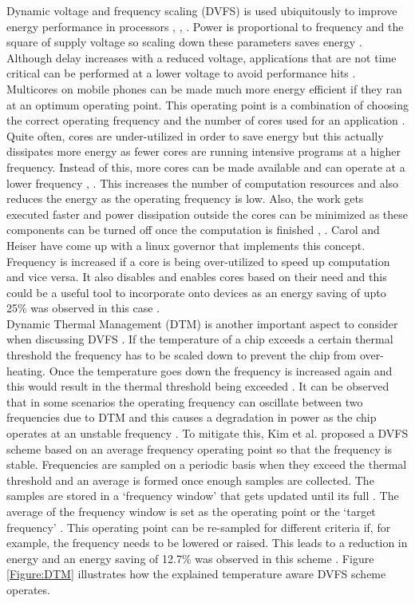 \documentclass[journal]{IEEEtran}
\begin{document}
Dynamic voltage and frequency scaling (DVFS) is used ubiquitously to improve energy performance in processors \cite{LinuxGov}, \cite{TempDVFS}, \cite{48Core}. Power is proportional to frequency and the square of supply voltage so scaling down these parameters saves energy \cite{TempDVFS}. Although delay increases with a reduced voltage, applications that are not time critical can be performed at a lower voltage to avoid performance hits \cite{LinuxGov}. Multicores on mobile phones can be made much more energy efficient if they ran at an optimum operating point. This operating point is a combination of choosing the correct operating frequency and the number of cores used for an application \cite{LinuxGov}. Quite often, cores are under-utilized in order to save energy but this actually dissipates more energy as fewer cores are running intensive programs at a higher frequency. Instead of this, more cores can be made available and can operate at a lower frequency \cite{LinuxGov}, \cite{MultiCores}. This increases the number of computation resources and also reduces the energy as the operating frequency is low. Also, the work gets executed faster and power dissipation outside the cores can be minimized as these components can be turned off once the computation is finished \cite{LinuxGov}, \cite{MultiCores}. Carol and Heiser \cite{LinuxGov} have come up with a linux governor that implements this concept. Frequency is increased if a core is being over-utilized to speed up computation and vice versa. It also disables and enables cores based on their need and this could be a useful tool to incorporate onto devices as an energy saving of upto 25\% was observed in this case \cite{LinuxGov}.\\

Dynamic Thermal Management (DTM) is another important aspect to consider when discussing DVFS \cite{TempDVFS}. If the temperature of a chip exceeds a certain thermal threshold the frequency has to be scaled down to prevent the chip from over-heating. Once the temperature goes down the frequency is increased again and this would result in the thermal threshold being exceeded \cite{TempDVFS}. It can be observed that in some scenarios the operating frequency can oscillate between two frequencies due to DTM and this causes a degradation in power as the chip operates at an unstable frequency \cite{TempDVFS}. To mitigate this, Kim et al. \cite{TempDVFS} proposed a DVFS scheme based on an average frequency operating point so that the frequency is stable. Frequencies are sampled on a periodic basis when they exceed the thermal threshold and an average is formed once enough samples are collected. The samples are stored in a `frequency window' that gets updated until its full \cite{TempDVFS}. The average of the frequency window is set as the operating point or the `target frequency' \cite{TempDVFS}. This operating point can be re-sampled for different criteria if, for example, the frequency needs to be lowered or raised. This leads to a reduction in energy and an energy saving of 12.7\% was observed in this scheme \cite{TempDVFS}. Figure \ref{Figure:DTM} illustrates how the explained temperature aware DVFS scheme operates.
\end{document}
